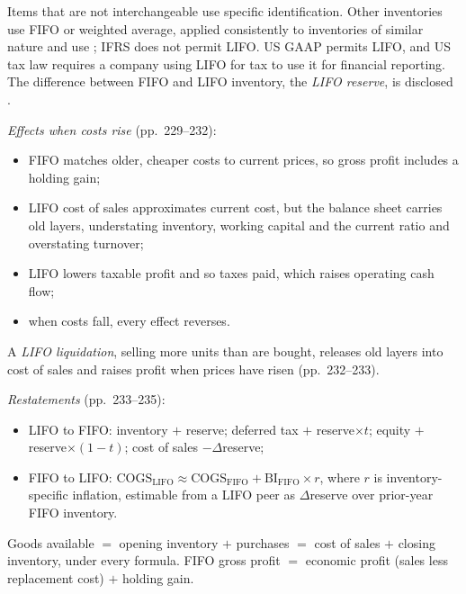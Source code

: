 \begin{qfmethod}\label{meth:inventory-cost-formulas}
 Items that are not interchangeable use specific identification. Other inventories use FIFO or weighted average, applied consistently to inventories of similar nature and use \citep[IAS~2 paras.~23--27]{eu-2023-1803-ias2}; IFRS does not permit LIFO. US GAAP permits LIFO, and US tax law requires a company using LIFO for tax to use it for financial reporting. The difference between FIFO and LIFO inventory, the \emph{LIFO reserve}, is disclosed \citep[pp.~228--235]{financial-statement-analysis-2009}.

\emph{Effects when costs rise} (pp.~229--232):
\begin{itemize}
\item FIFO matches older, cheaper costs to current prices, so gross profit includes a holding gain;
\item LIFO cost of sales approximates current cost, but the balance sheet carries old layers, understating inventory, working capital and the current ratio and overstating turnover;
\item LIFO lowers taxable profit and so taxes paid, which raises operating cash flow;
\item when costs fall, every effect reverses.
\end{itemize}
A \emph{LIFO liquidation}, selling more units than are bought, releases old layers into cost of sales and raises profit when prices have risen (pp.~232--233).

\emph{Restatements} (pp.~233--235):
\begin{itemize}
\item LIFO to FIFO: inventory $+$ reserve; deferred tax $+$ reserve$\times t$; equity $+$ reserve$\times(1-t)$; cost of sales $-\Delta$reserve;
\item FIFO to LIFO: $\text{COGS}_{\text{LIFO}}\approx\text{COGS}_{\text{FIFO}}+\text{BI}_{\text{FIFO}}\times r$, where $r$ is inventory-specific inflation, estimable from a LIFO peer as $\Delta$reserve over prior-year FIFO inventory.
\end{itemize}

 Goods available $=$ opening inventory $+$ purchases $=$ cost of sales $+$ closing inventory, under every formula. FIFO gross profit $=$ economic profit (sales less replacement cost) $+$ holding gain.


\end{qfmethod}
